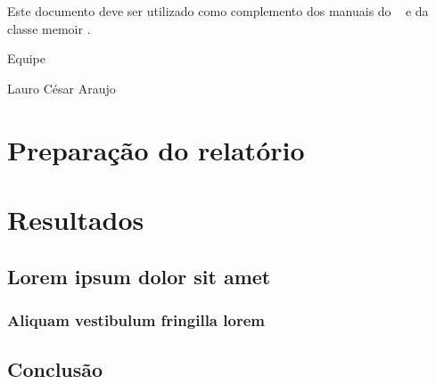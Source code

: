 \documentclass[
12pt,				%
openright,			%
twoside,			%
a4paper,			%
english,			%
french,				%
spanish,			%
brazil,				%
]{abntex2}
\begin{document}
	Este documento deve ser utilizado como complemento dos manuais do \abnTeX\ 
	\cite{abntex2classe,abntex2cite,abntex2cite-alf} e da classe \textsf{memoir}
	\cite{memoir}. 
	
	Equipe \abnTeX 
	
	Lauro César Araujo
	
	
	\part{Preparação do relatório}
	
	
	
	
	
	\part{Resultados}
	
	\chapter{Lorem ipsum dolor sit amet}
	
	\section{Aliquam vestibulum fringilla lorem}
	
	\lipsum[1]
	
	\lipsum[2-3]
	
	
	\chapter{Conclusão}
	
	\lipsum[31-33]
	
	\postextual
	
\end{document}
